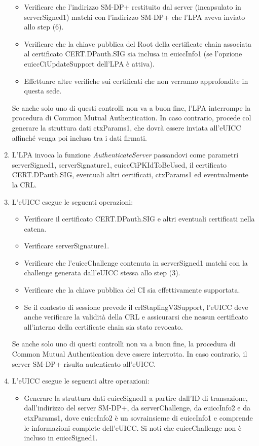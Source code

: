 \documentclass[10pt, oneside]{book}
\begin{document}
\begin{enumerate}
\begin{itemize}[itemsep=0pt]
\item Verificare che l'indirizzo SM-DP+ restituito dal server (incapsulato in serverSigned1) matchi con l'indirizzo SM-DP+ che l'LPA aveva inviato allo step (6).
\item Verificare che la chiave pubblica del Root della certificate chain associata al certificato CERT.DPauth.SIG sia inclusa in euiccInfo1 (se l'opzione euiccCiUpdateSupport dell'LPA è attiva).
\item Effettuare altre verifiche sui certificati che non verranno approfondite in questa sede.
\end{itemize}
Se anche solo uno di questi controlli non va a buon fine, l'LPA interrompe la procedura di Common Mutual Authentication. In caso contrario, procede col generare la struttura dati ctxParams1, che dovrà essere inviata all'eUICC affinché venga poi inclusa tra i dati firmati.
\item L'LPA invoca la funzione \textit{AuthenticateServer} passandovi come parametri serverSigned1, serverSignature1, euiccCiPKIdToBeUsed, il certificato CERT.DPauth.SIG, eventuali altri certificati, ctxParams1 ed eventualmente la CRL.
\item L'eUICC esegue le seguenti operazioni:
\begin{itemize}[itemsep=0pt]
\item Verificare il certificato CERT.DPauth.SIG e altri eventuali certificati nella catena.
\item Verificare serverSignature1.
\item Verificare che l'euiccChallenge contenuta in serverSigned1 matchi con la challenge generata dall'eUICC stessa allo step (3).
\item Verificare che la chiave pubblica del CI sia effettivamente supportata.
\item Se il contesto di sessione prevede il crlStaplingV3Support, l'eUICC deve anche verificare la validità della CRL e assicurarsi che nessun certificato all'interno della certificate chain sia stato revocato.
\end{itemize}
Se anche solo uno di questi controlli non va a buon fine, la procedura di Common Mutual Authentication deve essere interrotta. In caso contrario, il server SM-DP+ risulta autenticato all'eUICC.
\item L'eUICC esegue le seguenti altre operazioni:
\begin{itemize}[itemsep=0pt]
\item Generare la struttura dati euiccSigned1 a partire dall'ID di transazione, dall'indirizzo del server SM-DP+, da serverChallenge, da euiccInfo2 e da ctxParams1, dove euiccInfo2 è un sovrainsieme di euiccInfo1 e comprende le informazioni complete dell'eUICC. Si noti che euiccChallenge non è incluso in euiccSigned1.

\end{itemize}
\end{enumerate}
\end{document}
